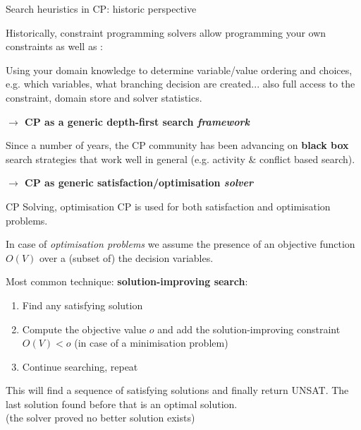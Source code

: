 \documentclass{cons-beamer}
\begin{document}
\begin{frame}{Search heuristics in CP: historic perspective}
	
	Historically, constraint programming solvers allow programming your own constraints as well as :
	\vfill
	
	Using your domain knowledge to determine variable/value ordering and choices, e.g. which variables, what branching decision are created... also full access to the constraint, domain store and solver statistics.
	
	\textbf{$\rightarrow$ CP as a generic depth-first search \textit{framework}}
	\vfill
	
	Since a number of years, the CP community has been advancing on \textbf{black box} search strategies that work well in general (e.g. activity \& conflict based search). %
	\pause
	
	\textbf{$\rightarrow$ CP as generic satisfaction/optimisation \textit{solver}}
	\vfill
	
\end{frame}

\begin{frame}{CP Solving, optimisation}
	CP is used for both satisfaction and optimisation problems.
	\vfill
	
	In case of \textit{optimisation problems} we assume the presence of an objective function $O(V)$ over a (subset of) the decision variables.
	\vfill
	\pause
	
	Most common technique: \textbf{solution-improving search}:
	\begin{enumerate}
		\item Find any satisfying solution
		\item Compute the objective value $o$ and add the solution-improving constraint $O(V) < o$ (in case of a minimisation problem)
		\item Continue searching, repeat
	\end{enumerate}
	\vfill
	\pause
	
	This will find a sequence of satisfying solutions and finally return UNSAT. The last solution found before that is an optimal solution.\\
	(the solver proved no better solution exists)
\end{frame}
\end{document}
